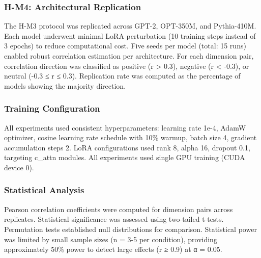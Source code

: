 \subsubsection{H-M4: Architectural Replication}

The H-M3 protocol was replicated across GPT-2, OPT-350M, and Pythia-410M. Each model underwent minimal LoRA perturbation (10 training steps instead of 3 epochs) to reduce computational cost. Five seeds per model (total: 15 runs) enabled robust correlation estimation per architecture. For each dimension pair, correlation direction was classified as positive (r > 0.3), negative (r < -0.3), or neutral (-0.3 ≤ r ≤ 0.3). Replication rate was computed as the percentage of models showing the majority direction.

\subsubsection{Training Configuration}

All experiments used consistent hyperparameters: learning rate 1e-4, AdamW optimizer, cosine learning rate schedule with 10\% warmup, batch size 4, gradient accumulation steps 2. LoRA configurations used rank 8, alpha 16, dropout 0.1, targeting c_attn modules. All experiments used single GPU training (CUDA device 0).

\subsubsection{Statistical Analysis}

Pearson correlation coefficients were computed for dimension pairs across replicates. Statistical significance was assessed using two-tailed t-tests. Permutation tests established null distributions for comparison. Statistical power was limited by small sample sizes (n = 3-5 per condition), providing approximately 50\% power to detect large effects (r ≥ 0.9) at α = 0.05.
